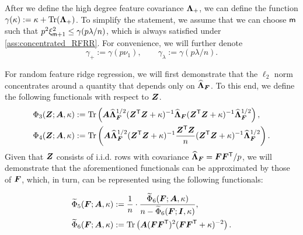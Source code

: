 After we define the high degree feature covariance \({\boldsymbol \Lambda}_+\), we can define the function \(\gamma (\kappa) := \kappa + {\rm Tr}({\boldsymbol \Lambda}_{+})\). To simplify the statement, we assume that we can choose ${\mathsf m}$ such that $p^2 \xi_{{\mathsf m} +1}^2 \leq \gamma (p\lambda/n)$, which is always satisfied under \cref{ass:concentrated_RFRR}. For convenience, we will further denote
\begin{equation}\label{eq:def_gamma_lamb_plus}
\gamma_+ := \gamma (p\nu_1) , \quad \quad \gamma_\lambda := \gamma (p\lambda / n).
\end{equation}

For random feature ridge regression, we will first demonstrate that the \(\ell_2\) norm concentrates around a quantity that depends only on \(\widehat{{\boldsymbol \Lambda}}_{\boldsymbol F}\). To this end, we define the following functionals with respect to \({\boldsymbol Z}\).
\begin{equation}\label{eq:functionals_Z}
\begin{aligned}
\Phi_3({\boldsymbol Z}; {\boldsymbol A}, \kappa) &:= {\rm Tr} \left( {\boldsymbol A} \widehat{{\boldsymbol \Lambda}}_{\boldsymbol F}^{1/2} ({\boldsymbol Z}^{\mathsf T} {\boldsymbol Z} + \kappa)^{-1} \widehat{{\boldsymbol \Lambda}}_{\boldsymbol F} ({\boldsymbol Z}^{\mathsf T} {\boldsymbol Z} + \kappa)^{-1} \widehat{{\boldsymbol \Lambda}}_{\boldsymbol F}^{1/2} \right),\\
\Phi_4({\boldsymbol Z}; {\boldsymbol A}, \kappa) &:= {\rm Tr} \left( {\boldsymbol A} \widehat{{\boldsymbol \Lambda}}_{\boldsymbol F}^{1/2} ({\boldsymbol Z}^{\mathsf T} {\boldsymbol Z} + \kappa)^{-1} \frac{{\boldsymbol Z}^{\mathsf T} {\boldsymbol Z}}{n} ({\boldsymbol Z}^{\mathsf T} {\boldsymbol Z} + \kappa)^{-1} \widehat{{\boldsymbol \Lambda}}_{\boldsymbol F}^{1/2} \right).
\end{aligned}
\end{equation}
Given that \({\boldsymbol Z}\) consists of i.i.d. rows with covariance \(\widehat{{\boldsymbol \Lambda}}_{\boldsymbol F} = {\boldsymbol F} {\boldsymbol F}^{\mathsf T} / p\), we will demonstrate that the aforementioned functionals can be approximated by those of \({\boldsymbol F}\), which, in turn, can be represented using the following functionals:

\begin{equation}\label{eq:det_equiv_Z_F}
\begin{aligned}
\widetilde{\Phi}_5({\boldsymbol F}; {\boldsymbol A}, \kappa) &:= \frac{1}{n} \cdot \frac{\widetilde{\Phi}_6({\boldsymbol F}; {\boldsymbol A}, \kappa)}{n - \widetilde{\Phi}_6({\boldsymbol F}; \bm{I}, \kappa)},\\
\widetilde{\Phi}_6({\boldsymbol F}; {\boldsymbol A}, \kappa) &:= {\rm Tr} \left( {\boldsymbol A} ({\boldsymbol F} {\boldsymbol F}^{\mathsf T})^2 ({\boldsymbol F} {\boldsymbol F}^{\mathsf T} + \kappa)^{-2} \right).\\
\end{aligned}
\end{equation}

